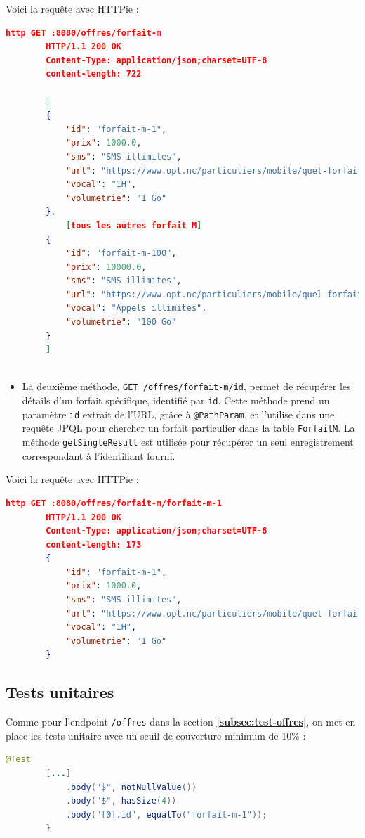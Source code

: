 \documentclass{article}
\begin{document}
	Voici la requête avec HTTPie : 
	
	\begin{lstlisting}[language=json]
		http GET :8080/offres/forfait-m
		HTTP/1.1 200 OK
		Content-Type: application/json;charset=UTF-8
		content-length: 722
		
		[
		{
			"id": "forfait-m-1",
			"prix": 1000.0,
			"sms": "SMS illimites",
			"url": "https://www.opt.nc/particuliers/mobile/quel-forfait-choisir/forfait-m-1-go",
			"vocal": "1H",
			"volumetrie": "1 Go"
		},
			[tous les autres forfait M]
		{
			"id": "forfait-m-100",
			"prix": 10000.0,
			"sms": "SMS illimites",
			"url": "https://www.opt.nc/particuliers/mobile/quel-forfait-choisir/forfait-m-100-go",
			"vocal": "Appels illimites",
			"volumetrie": "100 Go"
		}
		]
		
	\end{lstlisting}
	
	\begin{itemize}
		\item La deuxième méthode, \texttt{GET /offres/forfait-m/{id}}, permet de récupérer les détails d'un forfait spécifique, identifié par \texttt{id}. 
		Cette méthode prend un paramètre \texttt{id} extrait de l'URL, grâce à \texttt{@PathParam}, et l'utilise dans une requête JPQL pour chercher un forfait particulier dans la table \texttt{ForfaitM}. 
		La méthode \texttt{getSingleResult} est utilisée pour récupérer un seul enregistrement correspondant à l'identifiant fourni.
	\end{itemize}
	Voici la requête avec HTTPie :
	\begin{lstlisting}[language=json]
		http GET :8080/offres/forfait-m/forfait-m-1
		HTTP/1.1 200 OK
		Content-Type: application/json;charset=UTF-8
		content-length: 173
		{
			"id": "forfait-m-1",
			"prix": 1000.0,
			"sms": "SMS illimites",
			"url": "https://www.opt.nc/particuliers/mobile/quel-forfait-choisir/forfait-m-1-go",
			"vocal": "1H",
			"volumetrie": "1 Go"
		}
	\end{lstlisting}
	
	\subsection{Tests unitaires}
	\label{subsec:tests}
	Comme pour l'endpoint \texttt{/offres} dans la section \textbf{\ref{subsec:test-offres}}, on met en place les tests unitaire avec un seuil de couverture minimum de 10\% : 
	
	\begin{lstlisting}[language=java] 
	    @Test
		[...]
			.body("$", notNullValue())
			.body("$", hasSize(4))
			.body("[0].id", equalTo("forfait-m-1"));
		}
	\end{lstlisting}
	
\end{document}

